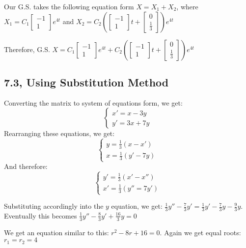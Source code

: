 \documentclass{article}
\begin{document}
\noindent Our G.S. takes the following equation form $X = X_{1} + X_{2}$, where $X_{1} = C_{1}\begin{bmatrix}
    -1 \\
    1
\end{bmatrix}e^{4t}$ and 
$X_{2} = C_{2}(\begin{bmatrix}
    -1 \\
    1
\end{bmatrix}t + \begin{bmatrix}
    0 \\
    \frac{1}{3}
\end{bmatrix})e^{4t}$ \par
\noindent Therefore, G.S. $X = C_{1}\begin{bmatrix}
    -1 \\
    1
\end{bmatrix}e^{4t} + C_{2}(\begin{bmatrix}
    -1 \\
    1
\end{bmatrix}t + \begin{bmatrix}
    0 \\
    \frac{1}{3}
\end{bmatrix})e^{4t}$

\subsection{7.3, Using Substitution Method}
\noindent Converting the matrix to system of equations form, we get:
$$
\begin{cases}
x' = x - 3y\\
y' = 3x + 7y
\end{cases}
$$
\noindent Rearranging these equations, we get:
$$
\begin{cases}
y = \frac{1}{3}(x - x')\\
x = \frac{1}{3}(y' - 7y)
\end{cases}
$$ 
\noindent And therefore:
$$
\begin{cases}
y' = \frac{1}{3}(x' - x'')\\
x' = \frac{1}{3}(y'' = 7y')
\end{cases}
$$ 

\noindent Substituting accordingly into the $y$ equation, we get: $\frac{1}{3}y'' - \frac{7}{3}y' = \frac{1}{3}y' - \frac{7}{3}y - \frac{9}{3}y$.  Eventually this becomes $\frac{1}{3}y'' - \frac{8}{3}y' + \frac{16}{3}y = 0$ \par
\noindent We get an equation similar to this: $r^{2} - 8r + 16 = 0$.  Again we get equal roots: $r_{1} = r_{2} = 4$ \par\vspace{0.25cm}
\end{document}
